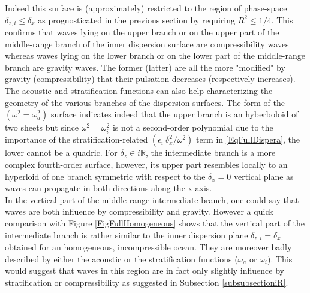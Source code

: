 \documentclass[a4paper,11pt]{article}
\begin{document}
Indeed this surface is (approximately) restricted to the region of phase-space $\delta_{z,i}\leq\delta_x$ as prognosticated in the previous section by requiring $R^2\leq1/4$.  This confirms that waves lying on the upper branch or on the upper part of the middle-range branch of the inner dispersion surface are compressibility waves whereas waves lying on the lower branch or on the lower part of the middle-range branch are gravity waves. The former (latter) are all the more "modified" by gravity (compressibility) that their pulsation decreases (respectively increases).\\
The acoustic and stratification functions can also help characterizing the geometry of the various branches of the dispersion surfaces. The form of the $(\omega^2=\omega_a^2)$ surface indicates indeed that the upper branch is an hyberboloid of two sheets but since $\omega^2=\omega_i^2$ is not a second-order polynomial due to the importance of the stratification-related $(\epsilon_i\ \delta_x^2 / \omega^2)$ term in \ref{EqFullDispera}, the lower cannot be a quadric. For $\delta_z\in i\mathbb{R}$, the intermediate branch is a more complex fourth-order surface, however, its upper part resembles locally to an hyperloid of one branch symmetric with respect to the $\delta_x = 0$ vertical plane as waves can propagate in both directions along the x-axis.\\
In the vertical part of the middle-range intermediate branch, one could say that waves are both influence by compressibility and gravity. However a quick comparison with Figure \ref{FigFullHomogeneous} shows that the vertical part of the intermediate branch is rather similar to the inner dispersion plane $\delta_{z,i}=\delta_x$ obtained for an homogeneous, incompressible ocean. They are moreover badly described by either the acoustic or the stratification functions ($\omega_a$ or $\omega_i$). This would suggest that waves in this region are in fact only slightly influence by stratification or compressibility as suggested in Subsection \ref{subsubsectioniR}.\\
\end{document}
